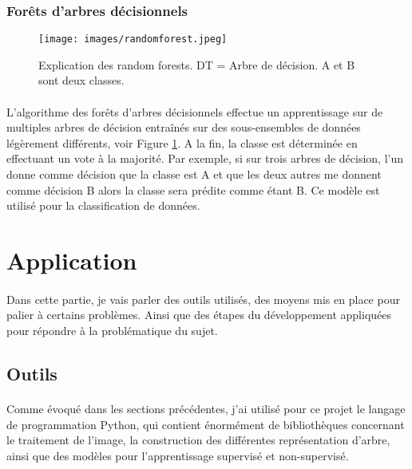 \documentclass[paper=a4, 11pt]{article}
\begin{document}
\subsubsection{Forêts d'arbres décisionnels}

\begin{figure}[h]
\centering
\texttt{[image: images/randomforest.jpeg]}
\caption{Explication des random forests. DT = Arbre de décision. A et B sont deux classes.}
\label{fig:randomforest}
\end{figure}

\paragraph{} L'algorithme des forêts d'arbres décisionnels effectue un apprentissage sur de multiples arbres de décision entraînés sur des sous-ensembles de données légèrement différents\cite{wikipedia}, voir Figure \ref{fig:randomforest}. A la fin, la classe est déterminée en effectuant un vote à la majorité. Par exemple, si sur trois arbres de décision, l'un donne comme décision que la classe est A et que les deux autres me donnent comme décision B alors la classe sera prédite comme étant B. Ce modèle est utilisé pour la classification de données.

\section{Application}
\paragraph{} Dans cette partie, je vais parler des outils utilisés, des moyens mis en place pour palier à certains problèmes. Ainsi que des étapes du développement appliquées pour répondre à la problématique du sujet.

\subsection{Outils}
\paragraph{} Comme évoqué dans les sections précédentes, j'ai utilisé pour ce projet le langage de programmation Python, qui contient énormément de bibliothèques concernant le traitement de l'image, la construction des différentes représentation d'arbre, ainsi que des modèles pour l'apprentissage supervisé et non-supervisé.
\end{document}
